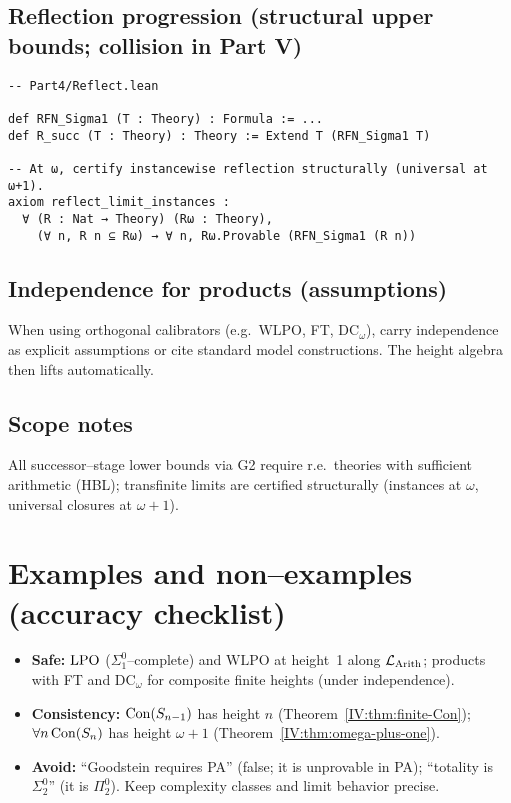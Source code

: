 \documentclass[11pt]{article}
\theoremstyle{definition}
\theoremstyle{remark}
\newcommand{\WLPO}{\mathrm{WLPO}}
\begin{document}
\subsection*{Reflection progression (structural upper bounds; collision in Part V)}
\begin{verbatim}
-- Part4/Reflect.lean

def RFN_Sigma1 (T : Theory) : Formula := ...
def R_succ (T : Theory) : Theory := Extend T (RFN_Sigma1 T)

-- At ω, certify instancewise reflection structurally (universal at ω+1).
axiom reflect_limit_instances :
  ∀ (R : Nat → Theory) (Rω : Theory),
    (∀ n, R n ⊆ Rω) → ∀ n, Rω.Provable (RFN_Sigma1 (R n))
\end{verbatim}

\subsection*{Independence for products (assumptions)}
When using orthogonal calibrators (e.g.\ \(\WLPO\), FT, $\mathrm{DC}_\omega$), carry independence as explicit assumptions or cite standard model constructions. The height algebra then lifts automatically.

\subsection*{Scope notes}
All successor–stage lower bounds via G2 require r.e.\ theories with sufficient arithmetic (HBL); transfinite limits are certified structurally (instances at $\omega$, universal closures at $\omega{+}1$).

\section{Examples and non--examples (accuracy checklist)}

\begin{itemize}
\item \textbf{Safe:} $\mathrm{LPO}$ (\(\Sigma^0_1\)–complete) and $\WLPO$ at height~1 along \(\mathcal{L}_{\mathrm{Arith}}\); products with FT and $\mathrm{DC}_\omega$ for composite finite heights (under independence).
\item \textbf{Consistency:} $\mathrm{Con}(S_{n-1})$ has height $n$ (Theorem~\ref{IV:thm:finite-Con}); $\forall n\,\mathrm{Con}(S_n)$ has height $\omega{+}1$ (Theorem~\ref{IV:thm:omega-plus-one}).
\item \textbf{Avoid:} “Goodstein requires PA” (false; it is unprovable in PA); “totality is $\Sigma^0_2$” (it is $\Pi^0_2$). Keep complexity classes and limit behavior precise.
\end{itemize}
\end{document}
